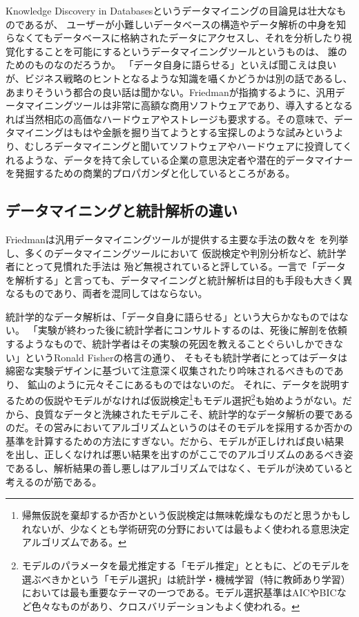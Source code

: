 Knowledge Discovery in Databasesというデータマイニングの目論見は壮大なものであるが、
ユーザーが小難しいデータベースの構造やデータ解析の中身を知らなくてもデータベースに格納されたデータにアクセスし、それを分析したり視覚化することを可能にするというデータマイニングツールというものは、
誰のためのものなのだろうか。
「データ自身に語らせる」といえば聞こえは良いが、ビジネス戦略のヒントとなるような知識を囁くかどうかは別の話であるし、あまりそういう都合の良い話は聞かない。Friedmanが指摘するように、汎用データマイニングツールは非常に高額な商用ソフトウェアであり、導入するとなるれば当然相応の高価なハードウェアやストレージも要求する。その意味で、データマイニングはもはや金脈を掘り当てようとする宝探しのような試みというより、むしろデータマイニングと聞いてソフトウェアやハードウェアに投資してくれるような、データを持て余している企業の意思決定者や潜在的データマイナーを発掘するための商業的プロパガンダと化しているところがある。

\subsection{データマイニングと統計解析の違い}
Friedmanは汎用データマイニングツールが提供する主要な手法の数々を
を列挙し、多くのデータマイニングツールにおいて
仮説検定や判別分析など、統計学者にとって見慣れた手法は
殆ど無視されていると評している。一言で「データを解析する」と言っても、データマイニングと統計解析は目的も手段も大きく異なるものであり、両者を混同してはならない。

統計学的なデータ解析は、「データ自身に語らせる」という大らかなものではない。
「実験が終わった後に統計学者にコンサルトするのは、死後に解剖を依頼するようなもので、統計学者はその実験の死因を教えることぐらいしかできない」というRonald Fisherの格言の通り、
そもそも統計学者にとってはデータは綿密な実験デザインに基づいて注意深く収集されたり吟味されるべきものであり、
鉱山のように元々そこにあるものではないのだ。
それに、データを説明するための仮説やモデルがなければ仮説検定\footnote{帰無仮説を棄却するか否かという仮説検定は無味乾燥なものだと思うかもしれないが、少なくとも学術研究の分野においては最もよく使われる意思決定アルゴリズムである。}もモデル選択\footnote{モデルのパラメータを最尤推定する「モデル推定」とともに、どのモデルを選ぶべきかという「モデル選択」は統計学・機械学習（特に教師あり学習）においては最も重要なテーマの一つである。モデル選択基準はAICやBICなど色々なものがあり、クロスバリデーションもよく使われる。}も始めようがない。だから、良質なデータと洗練されたモデルこそ、統計学的なデータ解析の要であるのだ。その営みにおいてアルゴリズムというのはそのモデルを採用するか否かの基準を計算するための方法にすぎない。だから、モデルが正しければ良い結果を出し、正しくなければ悪い結果を出すのがここでのアルゴリズムのあるべき姿であるし、解析結果の善し悪しはアルゴリズムではなく、モデルが決めていると考えるのが筋である。

